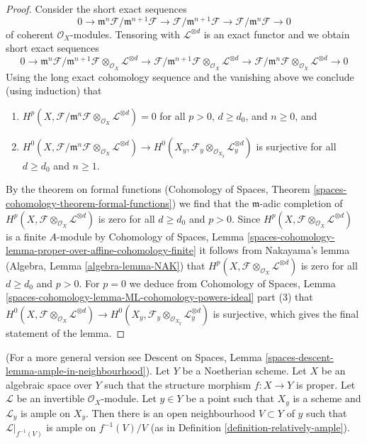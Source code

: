 \begin{proof}
\medskip\noindent
Consider the short exact sequences
$$
0 \to \mathfrak m^n\mathcal{F}/\mathfrak m^{n + 1} \mathcal{F}
\to \mathcal{F}/\mathfrak m^{n + 1} \mathcal{F}
\to \mathcal{F}/\mathfrak m^n \mathcal{F} \to 0
$$
of coherent $\mathcal{O}_X$-modules. Tensoring with $\mathcal{L}^{\otimes d}$
is an exact functor and we obtain short exact sequences
$$
0 \to
\mathfrak m^n\mathcal{F}/\mathfrak m^{n + 1} \mathcal{F}
\otimes_{\mathcal{O}_X} \mathcal{L}^{\otimes d}
\to \mathcal{F}/\mathfrak m^{n + 1} \mathcal{F}
\otimes_{\mathcal{O}_X} \mathcal{L}^{\otimes d}
\to \mathcal{F}/\mathfrak m^n \mathcal{F}
\otimes_{\mathcal{O}_X} \mathcal{L}^{\otimes d} \to 0
$$
Using the long exact cohomology sequence and the vanishing above
we conclude (using induction) that
\begin{enumerate}
\item $H^p(X, \mathcal{F}/\mathfrak m^n \mathcal{F}
\otimes_{\mathcal{O}_X} \mathcal{L}^{\otimes d}) = 0$
for all $p > 0$, $d \geq d_0$, and $n \geq 0$, and
\item $H^0(X, \mathcal{F}/\mathfrak m^n \mathcal{F}
\otimes_{\mathcal{O}_X} \mathcal{L}^{\otimes d}) \to
H^0(X_y, \mathcal{F}_y \otimes_{\mathcal{O}_{X_y}} \mathcal{L}_y^{\otimes d})$
is surjective for all $d \geq d_0$ and $n \geq 1$.
\end{enumerate}
By the theorem on formal functions
(Cohomology of Spaces, Theorem
\ref{spaces-cohomology-theorem-formal-functions})
we find that the $\mathfrak m$-adic completion of
$H^p(X, \mathcal{F} \otimes_{\mathcal{O}_X} \mathcal{L}^{\otimes d})$
is zero for all $d \geq d_0$ and $p > 0$.
Since $H^p(X, \mathcal{F} \otimes_{\mathcal{O}_X} \mathcal{L}^{\otimes d})$
is a finite $A$-module by
Cohomology of Spaces, Lemma
\ref{spaces-cohomology-lemma-proper-over-affine-cohomology-finite}
it follows from Nakayama's lemma (Algebra, Lemma \ref{algebra-lemma-NAK})
that $H^p(X, \mathcal{F} \otimes_{\mathcal{O}_X} \mathcal{L}^{\otimes d})$
is zero for all $d \geq d_0$ and $p > 0$.
For $p = 0$ we deduce from
Cohomology of Spaces, Lemma
\ref{spaces-cohomology-lemma-ML-cohomology-powers-ideal} part (3)
that $H^0(X, \mathcal{F} \otimes_{\mathcal{O}_X} \mathcal{L}^{\otimes d}) \to
H^0(X_y, \mathcal{F}_y \otimes_{\mathcal{O}_{X_y}} \mathcal{L}_y^{\otimes d})$
is surjective, which gives the final statement of the lemma.
\end{proof}

\begin{lemma}
\label{lemma-ample-in-neighbourhood}
(For a more general version see
Descent on Spaces, Lemma \ref{spaces-descent-lemma-ample-in-neighbourhood}).
Let $Y$ be a Noetherian scheme. Let $X$ be an algebraic space over $Y$
such that the structure morphism $f : X \to Y$ is proper.
Let $\mathcal{L}$ be an invertible $\mathcal{O}_X$-module.
Let $y \in Y$ be a point such that $X_y$ is a scheme and
$\mathcal{L}_y$ is ample on $X_y$.
Then there is an open neighbourhood $V \subset Y$
of $y$ such that $\mathcal{L}|_{f^{-1}(V)}$ is ample on $f^{-1}(V)/V$
(as in Definition \ref{definition-relatively-ample}).
\end{lemma}

